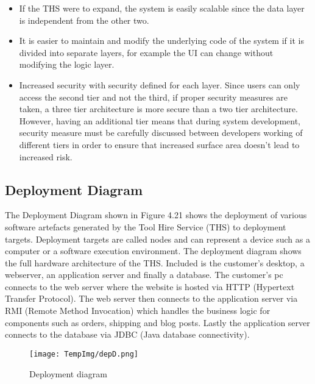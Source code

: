 \documentclass[fontsize=11pt]{extarticle}
\numberwithin{figure}{section} %
\numberwithin{table}{section}%
\begin{document}
\begin{itemize}
  \item If the THS were to expand, the system is easily scalable since the data layer is independent from the other two.

  \item It is easier to maintain and modify the underlying code of the system if it is divided into separate layers, for example the UI can change without modifying the logic layer.

  \item Increased security with security defined for each layer. Since users can only access the second tier and not the third, if proper security measures are taken, a three tier architecture is more secure than a two tier architecture. However, having an additional tier means that during system development, security measure must be carefully discussed between developers working of different tiers in order to ensure that increased surface area doesn’t lead to increased risk. 

\end{itemize}

\hypertarget{deployment-diagram}{%
\subsection{Deployment Diagram}\label{deployment-diagram}}

The Deployment Diagram shown in Figure 4.21 shows the deployment of
various software artefacts generated by the Tool Hire Service (THS) to
deployment targets. Deployment targets are called nodes and can
represent a device such as a computer or a software execution
environment. The deployment diagram shows the full hardware architecture
of the THS. Included is the customer's desktop, a webserver, an
application server and finally a database. The customer's pc connects to
the web server where the website is hosted via HTTP (Hypertext Transfer
Protocol). The web server then connects to the application server via
RMI (Remote Method Invocation) which handles the business logic for
components such as orders, shipping and blog posts. Lastly the
application server connects to the database via JDBC (Java database
connectivity).

\begin{figure}[H]
      \centering
      \texttt{[image: TempImg/depD.png]}
      \caption{Deployment diagram}
\end{figure}
\end{document}
